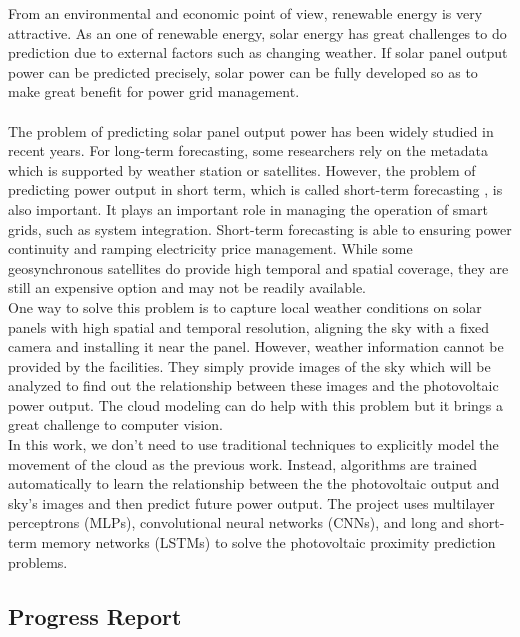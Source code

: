 \documentclass{elegantpaper}
\begin{document}
From an environmental and economic point of view, renewable energy is very attractive. As an one of renewable energy, solar energy has great challenges to do prediction due to external factors such as changing weather.\cite{schweiger2017understanding} If  solar panel output power can be predicted precisely,  solar power can be fully developed so as to make great benefit for power grid management.\cite{wan2015photovoltaic} \\[2ex]
\\
	The problem of predicting solar panel output power has been widely studied in recent years. For  long-term forecasting, some researchers rely on the metadata which is supported by weather station or satellites.\cite{deo2017forecasting} 
	 However, the problem of predicting power output in short term, which is called short-term forecasting , is also important. It plays an important role  in managing the operation of smart grids, such as system integration. Short-term forecasting is able to ensuring power continuity and ramping electricity price management.\cite{antonanzas2016review} While some geosynchronous satellites do provide high temporal and spatial coverage, they are still an expensive option and may not be readily available.\\[2ex]
	 One way to solve this problem is to capture local weather conditions on solar panels with high spatial and temporal resolution, aligning the sky with a fixed camera and installing it near the panel.\cite{yang2014solar} However,  weather information cannot be provided by the facilities.  They simply provide images of the sky which will be analyzed to find out the relationship between these images and the photovoltaic power output. The cloud modeling can do help with this problem but it brings a great challenge to computer vision.\cite{fathi2015automated} \\[2ex]
	 In this work, we don't need to use traditional  techniques to explicitly model the movement of the cloud as the previous work. Instead,  algorithms are trained  automatically to learn the relationship between the the photovoltaic output  and sky's images and then predict future power output. The project uses multilayer perceptrons (MLPs), convolutional neural networks (CNNs), and long and short-term memory networks (LSTMs)  to solve the photovoltaic proximity prediction problems.\\[2ex]
	 




\subsection{Progress Report}
\end{document}
